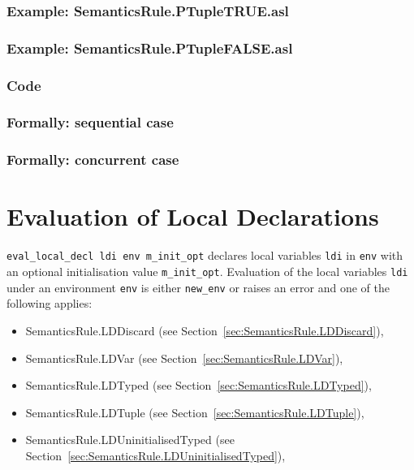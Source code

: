 \documentclass{book}
\begin{document}
    \subsection{Example: SemanticsRule.PTupleTRUE.asl}

    \subsection{Example: SemanticsRule.PTupleFALSE.asl}

  \subsection{Code}

\begin{emptyformal}
  \subsection{Formally: sequential case}

  \subsection{Formally: concurrent case}
\end{emptyformal}


\chapter{Evaluation of Local Declarations \label{chap:eval_local_decl}}

\texttt{eval\_local\_decl ldi env m\_init\_opt} declares local variables
\texttt{ldi} in \texttt{env} with an optional initialisation value
\texttt{m\_init\_opt}.  Evaluation of the local variables \texttt{ldi}
under an environment \texttt{env} is either \texttt{new\_env} or raises an
error and one of the following applies:
\begin{itemize}
  \item SemanticsRule.LDDiscard (see Section~\ref{sec:SemanticsRule.LDDiscard}),
  \item SemanticsRule.LDVar (see Section~\ref{sec:SemanticsRule.LDVar}),
  \item SemanticsRule.LDTyped (see Section~\ref{sec:SemanticsRule.LDTyped}),
  \item SemanticsRule.LDTuple (see Section~\ref{sec:SemanticsRule.LDTuple}),
  \item SemanticsRule.LDUninitialisedTyped (see Section~\ref{sec:SemanticsRule.LDUninitialisedTyped}),
\end{itemize}
\end{document}
